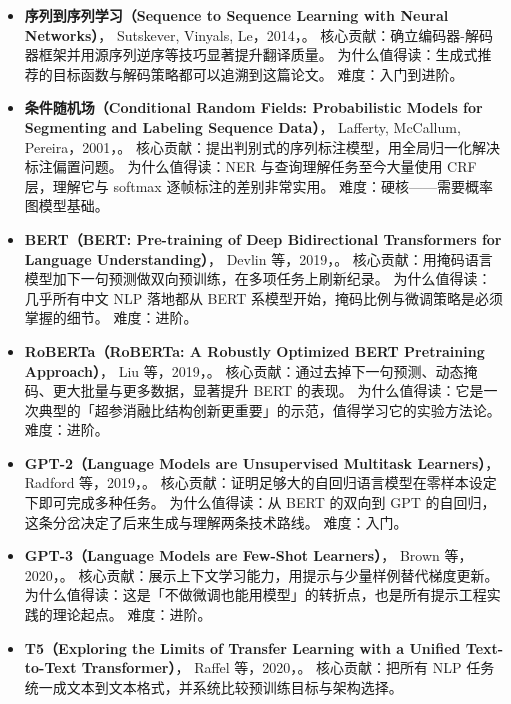 \begin{itemize}
        难度：进阶。
  \item \textbf{序列到序列学习（Sequence to Sequence Learning with Neural Networks）}，
        Sutskever, Vinyals, Le，2014，\cite{sutskever2014seq2seq}。
        核心贡献：确立编码器-解码器框架并用源序列逆序等技巧显著提升翻译质量。
        为什么值得读：生成式推荐的目标函数与解码策略都可以追溯到这篇论文。
        难度：入门到进阶。
  \item \textbf{条件随机场（Conditional Random Fields: Probabilistic Models for Segmenting and Labeling Sequence Data）}，
        Lafferty, McCallum, Pereira，2001，\cite{lafferty2001crf}。
        核心贡献：提出判别式的序列标注模型，用全局归一化解决标注偏置问题。
        为什么值得读：NER 与查询理解任务至今大量使用 CRF 层，理解它与 softmax 逐帧标注的差别非常实用。
        难度：硬核——需要概率图模型基础。
  \item \textbf{BERT（BERT: Pre-training of Deep Bidirectional Transformers for Language Understanding）}，
        Devlin 等，2019，\cite{devlin2019bert}。
        核心贡献：用掩码语言模型加下一句预测做双向预训练，在多项任务上刷新纪录。
        为什么值得读：几乎所有中文 NLP 落地都从 BERT 系模型开始，掩码比例与微调策略是必须掌握的细节。
        难度：进阶。
  \item \textbf{RoBERTa（RoBERTa: A Robustly Optimized BERT Pretraining Approach）}，
        Liu 等，2019，\cite{liu2019roberta}。
        核心贡献：通过去掉下一句预测、动态掩码、更大批量与更多数据，显著提升 BERT 的表现。
        为什么值得读：它是一次典型的「超参消融比结构创新更重要」的示范，值得学习它的实验方法论。
        难度：进阶。
  \item \textbf{GPT-2（Language Models are Unsupervised Multitask Learners）}，
        Radford 等，2019，\cite{radford2019gpt2}。
        核心贡献：证明足够大的自回归语言模型在零样本设定下即可完成多种任务。
        为什么值得读：从 BERT 的双向到 GPT 的自回归，这条分岔决定了后来生成与理解两条技术路线。
        难度：入门。
  \item \textbf{GPT-3（Language Models are Few-Shot Learners）}，
        Brown 等，2020，\cite{brown2020gpt3}。
        核心贡献：展示上下文学习能力，用提示与少量样例替代梯度更新。
        为什么值得读：这是「不做微调也能用模型」的转折点，也是所有提示工程实践的理论起点。
        难度：进阶。
  \item \textbf{T5（Exploring the Limits of Transfer Learning with a Unified Text-to-Text Transformer）}，
        Raffel 等，2020，\cite{raffel2020t5}。
        核心贡献：把所有 NLP 任务统一成文本到文本格式，并系统比较预训练目标与架构选择。

\end{itemize}
